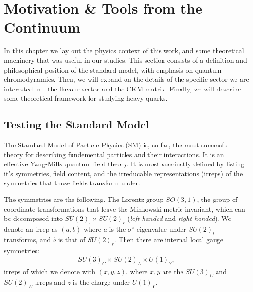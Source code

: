\chapter{Motivation \& Tools from the Continuum}
\label{chap:background}

In this chapter we lay out the physics context of this work, and some theoretical machinery that was useful in our studies. This section consists of a definition and philosophical position of the standard model, with emphasis on quantum chromodynamics. Then, we will expand on the details of the specific sector we are interested in - the flavour sector and the CKM matrix. Finally, we will describe some theoretical framework for studying heavy quarks.

\section{Testing the Standard Model}

{}

The Standard Model of Particle Physics (SM) is, so far, the most successful theory for describing fundemental particles and their interactions. It is an effective Yang-Mills quantum field theory. It is most succinctly defined by listing it's symmetries, field content, and the irreducable representations (irreps) of the symmetries that those fields transform under.

The symmetries are the following. The Lorentz group $SO(3,1)$, the group of coordinate transformations that leave the Minkowski metric invariant, which can be decomposed into $SU(2)_l\times SU(2)_r$ ({\it{left-handed}} and {\it{right-handed}}). We denote an irrep as $(a,b)$ where $a$ is the $\sigma^z$ eigenvalue under $SU(2)_l$ transforms, and $b$ is that of $SU(2)_r$. Then there are internal local gauge symmetries:
\begin{align}
  SU(3)_C\times SU(2)_L \times U(1)_Y,
\end{align}
irreps of which we denote with $(x,y,z)$, where $x,y$ are the $SU(3)_C$ and $SU(2)_W$ irreps and $z$ is the charge under $U(1)_Y$.

